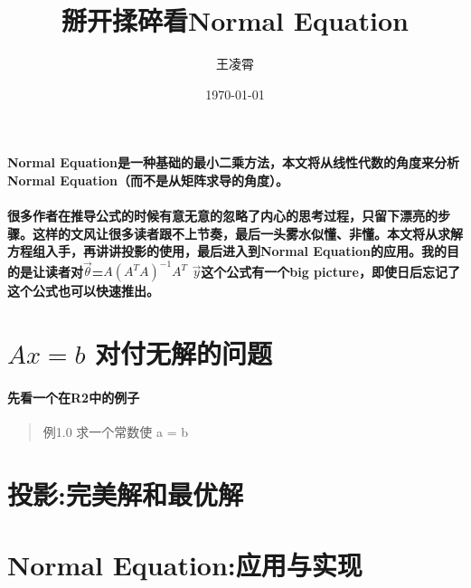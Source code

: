 \documentclass[UTF8]{ctexart}
\title{掰开揉碎看Normal Equation}
\author{王凌霄}
\date{\today}
\begin{document}
\maketitle

\paragraph{\indent Normal Equation是一种基础的最小二乘方法，本文将从线性代数的角度来分析Normal Equation（而不是从矩阵求导的角度）。}

\paragraph{\indent 很多作者在推导公式的时候有意无意的忽略了内心的思考过程，只留下漂亮的步骤。这样的文风让很多读者跟不上节奏，最后一头雾水似懂、非懂。本文将从求解方程组入手，再讲讲投影的使用，最后进入到Normal Equation的应用。我的目的是让读者对$\overrightarrow{\theta}$=$A(A^T A)^{-1}A^T$ $\overrightarrow{y}$这个公式有一个big picture，即使日后忘记了这个公式也可以快速推出。}

\section{$Ax=b$ 对付无解的问题}
\paragraph{先看一个在R2中的例子}
\begin{quote}
	例1.0 求一个常数\theta 使 \theta a = b
\end{quote}
\section{投影:完美解和最优解}
\section{Normal Equation:应用与实现}
\end{document}
